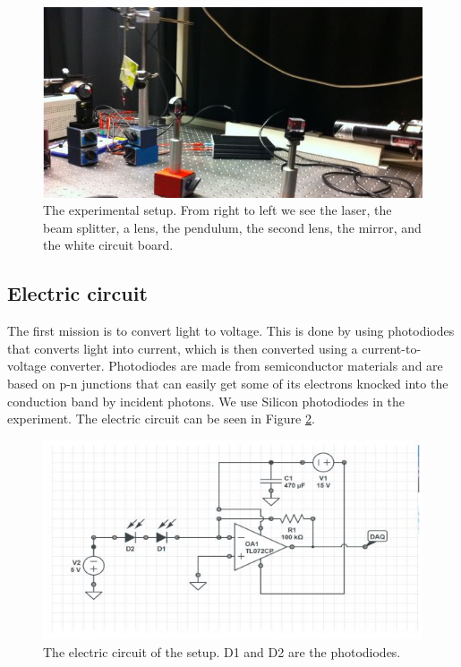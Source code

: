 \documentclass[11pt, a4paper]{article}
\begin{document}
\begin{figure}[h]
	\centering
	\includegraphics[scale=0.8]{setup}
	\caption{The experimental setup. From right to left we see the laser, the beam splitter, a lens, the pendulum, the second lens, the mirror, and the white circuit board.}
	\label{f:setup}
\end{figure}

\subsection{Electric circuit}
\label{s:Electric circuit}
The first mission is to convert light to voltage. This is done by using photodiodes 
that converts light into current, which is then converted using a
current-to-voltage converter.
Photodiodes are made from semiconductor materials and are based on p-n junctions that can easily get some of its electrons knocked into the conduction band by incident photons. 
We use Silicon photodiodes in the experiment. 
The electric circuit can be seen in Figure \ref{f:circuit}.
\begin{figure}[h]
	\centering
	\includegraphics{circuit}
	\caption{The electric circuit of the setup. D1 and D2 are the photodiodes.}
	\label{f:circuit}
\end{figure}
\end{document}
